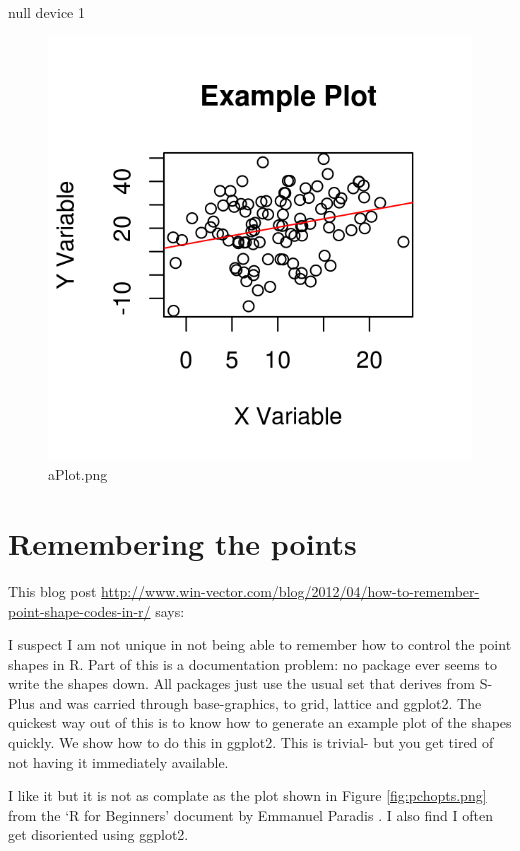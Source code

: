 \documentclass[a4paper]{article}
\begin{document}
\begin{Schunk}
\begin{Soutput}
null device 
          1 
\end{Soutput}
\end{Schunk}
\begin{figure}[!h]
\centering
\includegraphics[width=\textwidth]{aPlot.png}
\caption{aPlot.png}
\label{fig:aPlot.png}
\end{figure}
\clearpage
\section{Remembering the points}
This blog post \url{http://www.win-vector.com/blog/2012/04/how-to-remember-point-shape-codes-in-r/} says:

I suspect I am not unique in not being able to remember how to control the point shapes in R. Part of this is a documentation problem: no package ever seems to write the shapes down. All packages just use the usual set that derives from S-Plus and was carried through base-graphics, to grid, lattice and ggplot2. The quickest way out of this is to know how to generate an example plot of the shapes quickly. We show how to do this in ggplot2. This is trivial- but you get tired of not having it immediately available.


I like it but it is not as complate as the plot shown in Figure \ref{fig:pchopts.png} from the `R for Beginners' document by Emmanuel Paradis \cite{Paradis2002}.  I also find I often get disoriented using ggplot2.
\end{document}
